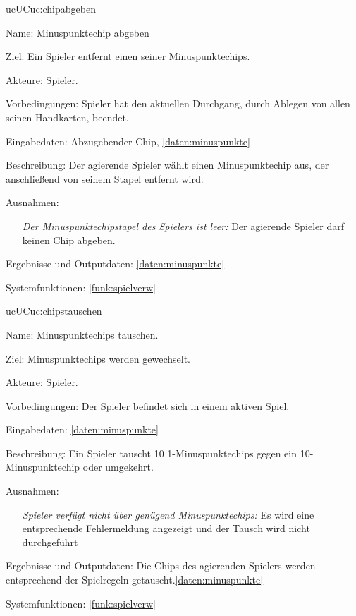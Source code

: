 \begin{description}[leftmargin=5em, style=sameline]
	\begin{lhp}{uc}{UC}{uc:chipabgeben}
		\item [Name:]Minuspunktechip abgeben
		\item [Ziel:]Ein Spieler entfernt einen seiner Minuspunktechips.
		\item [Akteure:]Spieler.
		\item [Vorbedingungen:]Spieler hat den aktuellen Durchgang, durch Ablegen von allen seinen Handkarten, beendet.
		\item [Eingabedaten:]Abzugebender Chip, \ref{daten:minuspunkte}
		\item [Beschreibung:]Der agierende Spieler wählt einen Minuspunktechip aus, der anschließend von seinem Stapel entfernt wird.
		\item [Ausnahmen:]\hfill
		\begin{itemize}
		    \item[]
		    \textit{Der Minuspunktechipstapel des Spielers ist leer: }Der agierende Spieler darf keinen Chip abgeben.
		\end{itemize}
		\item [Ergebnisse und Outputdaten:] \ref{daten:minuspunkte}
		\item [Systemfunktionen:] 
		\ref{funk:spielverw}
	\end{lhp}
	
			\begin{lhp}{uc}{UC}{uc:chipstauschen}
		\item [Name:]Minuspunktechips tauschen.
		\item [Ziel:]Minuspunktechips werden gewechselt.
		\item [Akteure:]Spieler.
		\item [Vorbedingungen:]Der Spieler befindet sich in einem aktiven Spiel.
		\item [Eingabedaten:]\ref{daten:minuspunkte}
		\item [Beschreibung:]Ein Spieler tauscht 10 1-Minuspunktechips gegen ein 10-Minuspunktechip oder umgekehrt.
		\item [Ausnahmen:]\hfill
		\begin{itemize}
		    \item[]
		    \textit{Spieler verfügt nicht über genügend Minuspunktechips: }Es wird eine entsprechende Fehlermeldung angezeigt und der Tausch wird nicht durchgeführt
		\end{itemize}
		\item [Ergebnisse und Outputdaten:]Die Chips des agierenden Spielers werden entsprechend der Spielregeln getauscht.\ref{daten:minuspunkte}
		\item [Systemfunktionen:]
		\ref{funk:spielverw}
	\end{lhp}
	

\end{description}
